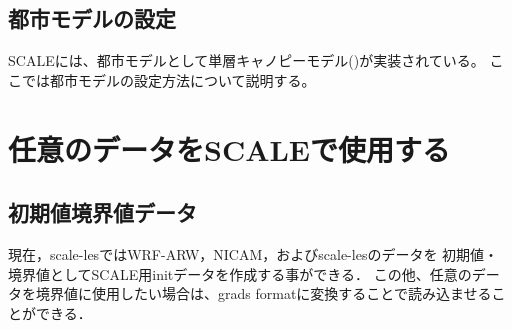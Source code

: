 \subsection{都市モデルの設定} \label{sec:adv_urban}
SCALEには、都市モデルとして単層キャノピーモデル(\cite{kusaka_2001})が実装されている。
ここでは都市モデルの設定方法について説明する。



\section{任意のデータをSCALEで使用する} \label{sec:adv_datainput}





\subsection{初期値境界値データ} \label{sec:adv_bnddata}

現在，scale-lesではWRF-ARW，NICAM，およびscale-lesのデータを
初期値・境界値としてSCALE用initデータを作成する事ができる．
この他、任意のデータを境界値に使用したい場合は、grads formatに変換することで読み込ませることができる．





